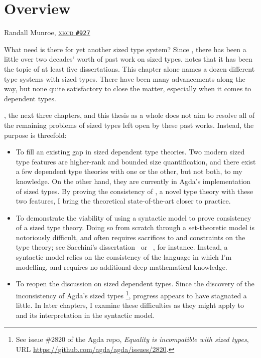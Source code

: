 \chapter{Overview} \label{ch:overview}

{Randall Munroe, \href{https://xkcd.com/927/}{\textsc{xkcd} \texttt{\#927}}}

What need is there for yet another sized type system?
Since \citet{hughes}, there has been a little over two decades' worth of past work on sized types.
\citet{flationary} notes that it has been the topic of at least five dissertations.
This chapter alone names a dozen different type systems with sized types.
There have been many advancements along the way,
but none quite satisfactory to close the matter,
especially when it comes to dependent types.

\lang, the next three chapters, and this thesis as a whole does not aim to resolve
all of the remaining problems of sized types left open by these past works.
Instead, the purpose is threefold:

\begin{itemize}
  \item To fill an existing gap in sized dependent type theories.
    Two modern sized type features are higher-rank and bounded size quantification,
    and there exist a few dependent type theories with one or the other,
    but not both, to my knowledge.
    On the other hand, they are currently in Agda's implementation of sized types.
    By proving the consistency of \lang, a novel type theory with these two features,
    I bring the theoretical state-of-the-art closer to practice.
  \item To demonstrate the viability of using a syntactic model to prove consistency
    of a sized type theory.
    Doing so from scratch through a set-theoretic model is notoriously difficult,
    and often requires sacrifices to and constraints on the type theory;
    see Sacchini's dissertation~\citep{CIC-hat-minus} or \CIChatstar~\citep{CIC-hat-star},
    for instance.
    Instead, a syntactic model relies on the consistency of the language in which I'm modelling,
    and requires no additional deep mathematical knowledge.
  \clearpage %
  \item To reopen the discussion on sized dependent types.
    Since the discovery of the inconsistency of Agda's sized types%
    \footnote{\label{foot:agda-inconsistent} See issue \#2820 of the Agda repo,
    \textit{Equality is incompatible with sized types},
    URL \url{https://github.com/agda/agda/issues/2820}.},
    progress appears to have stagnated a little.
    In later chapters, I examine these difficulties as they might apply to \lang
    and its interpretation in the syntactic model.
\end{itemize}


